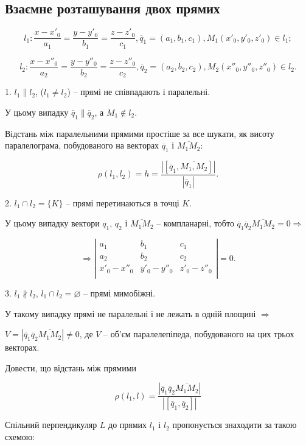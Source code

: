 \subsection{Взаємне розташування двох прямих}

$$l_1: \dfrac{x-x'_0}{a_1} = \dfrac{y-y'_0}{b_1} = \dfrac{z-z'_0}{c_1},
\overline{q}_1 = (a_1,b_1,c_1),
M_1(x'_0,y'_0,z'_0) \in l_1;$$

$$l_2: \dfrac{x-x''_0}{a_2} = \dfrac{y-y''_0}{b_2} = \dfrac{z-z''_0}{c_2},
\overline{q}_2 = (a_2,b_2,c_2),
M_2(x''_0,y''_0,z''_0) \in l_2.$$

1. $l_1 \parallel l_2$, ($l_1 \neq l_2$) -- прямі не співпадають і паралельні.


У цьому випадку $\overline{q}_1 \parallel \overline{q}_2$, а $M_1 \notin l_2$.

Відстань між паралельними прямими
простіше за все шукати, як висоту
паралелограма, побудованого на
векторах $\overline{q}_1$ і $\overline{M_1M_2}$:

$$\rho(l_1,l_2) = h = \dfrac{|[\overline{q}_1,\overline{M_1,M_2}]|}{|\overline{q}_1|}.$$



2. $l_1 \cap l_2 = \{K\}$ -- прямі перетинаються в точці $K$.


У цьому випадку вектори $q_1$, $q_2$ і
$\overline{M_1M_2}$ -- компланарні,
тобто $\overline{q}_1 \overline{q}_2 \overline{M_1M_2} = 0 \Rightarrow$

$$\Rightarrow \left| \begin{matrix}
	a_1 & b_1 & c_1 \\
	a_2 & b_2 & c_2 \\
	x'_0 - x''_0 & y'_0 - y''_0 & z'_0 - z''_0 \\
\end{matrix} \right| = 0.$$



3. $l_1 \nparallel l_2$, $l_1 \cap l_2 = \varnothing$ -- прямі мимобіжні.


У такому випадку прямі не
паралельні і не лежать в одній
площині $\Rightarrow$

$V = |\overline{q}_1 \overline{q}_2 \overline{M_1M_2}| \neq 0$, де $V$ -- об’єм
паралелепіпеда, побудованого на цих
трьох векторах.

Довести, що відстань між прямими

$$\rho(l_1,l) = \dfrac{|\overline{q}_1 \overline{q}_2 \overline{M_1M_2}|}{|[\overline{q}_1,\overline{q}_2]|}$$


Спільний перпендикуляр $L$ до прямих $l_1$ і $l_2$ пропонується знаходити за
такою схемою:


